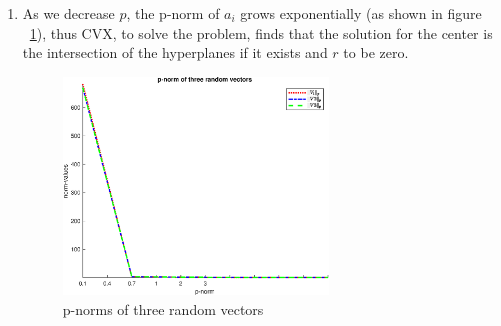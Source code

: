 \documentclass[10pt]{article}
\newcommand{\0}{\mat{0}}
\begin{document}
\begin{enumerate}
\begin{enumerate}
\begin{verbatim}
% Compute the Chebyshev center of a polyhedron
function [x_sol, r_sol] = chebyshev_center_with_norm(A, b, p)
% The goal is to find the largest Euclidean ball (i.e. its center and
% radius) that lies in a polyhedron described by linear inequalites in this
% fashion: P = {x : a_i'*x <= b_i, i=1,...,m}

rng('default')
format long g
[~,n]=size(A);

% Build and execute model
fprintf(1,'Computing Chebyshev center...');
cvx_begin
    variable r(1)
    variable x_c(2)
    maximize ( r )
    for k=1:n
        A(:, k)' * x_c + r * norm(A(:, k), p) <= b(k);
    end
cvx_end
fprintf(1,'Done! \n');
x_sol = x_c;
r_sol = r;


% Display results
fprintf(1,"The Chebyshev center coordinates are: \n");
disp(x_c);
txt = "Radius of largest 'scaled unit ball' using norm p:" + num2str(p) + "\n";
fprintf(1,txt);
disp(r);

% Generate the figure
x = linspace(-2,2);
for k=1:n
    plot(x, -x * A(1,k)./A(2,k) + b(k)./A(2,k),"b-");
    hold on
end

n_vecs = 100;
[x, y] = gen_random_vectors(n_vecs, p);
x = x.* r + x_c(1);
y = y.* r + x_c(2);

for i=1:n_vecs
    plot(x(i), y(i), "r." );
    hold on
end
plot(x_c(1),x_c(2),'b*');
xlabel("x-axis")
ylabel("y-axis")

txt1 = "# inequalities:" + num2str(n);
tx2 = "norm-p:" + num2str(p);
title({"Largest 'scaled unit ball' laying in a 2D polyhedron", txt1, tx2});
text(x_c(1), x_c(2), "\leftarrow  center")
axis([-1 1 -1 1])
axis equal
hold off
txt = "chebyshev_center_norm_" + num2str(p);
saveas(gcf,txt,'epsc')

function [x, y] = gen_random_vectors(n, p)
    r = randn(n, 2); % Use a large n
    for i=1:n
        norm_r = norm(r(i,:), p);
        r(i, :) = r(i, :) ./ norm_r;
    end
    x = r(:, 1);
    y = r(:, 2);
    
\end{verbatim}

\item As we decrease $p$, the p-norm of $a_i$ grows exponentially (as shown in figure ~\ref{fig6}), thus CVX, to solve the problem, finds that the solution for the center is the intersection of the hyperplanes if it exists and $r$ to be zero.

\begin{figure}[H]
	\centering
	\includegraphics[width=200pt]{figures/p_norm_trend}
	\caption{p-norms of three random vectors }
	\label{fig6}
\end{figure}


\end{enumerate}
\end{enumerate}
\end{document}
